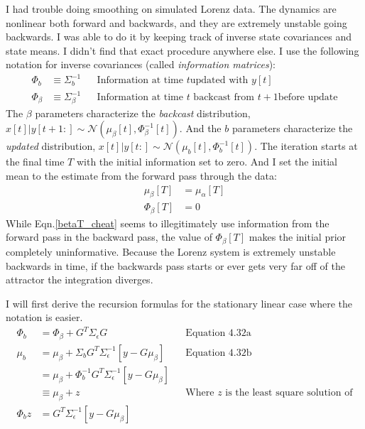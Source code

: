 \documentclass[prelim,showlabels]{book}
\newcommand{\Normal}{{\mathcal{N}}}
\begin{document}
I had trouble doing smoothing on simulated Lorenz data.  The dynamics
are nonlinear both forward and backwards, and they are extremely
unstable going backwards.  I was able to do it by keeping track of
inverse state covariances and state means.  I didn't find that exact
procedure anywhere else.  I use the following notation for inverse
covariances (called \emph{information matrices}):
\begin{align}
  \Phi_b &\equiv \Sigma_b^{-1} && \text{Information at time $t$
                                  updated with $y[t]$}\\
  \Phi_\beta &\equiv \Sigma_\beta^{-1} && \text{Information at time
                                          $t$ backcast from $t+1$
                                          before update}                             
\end{align}
The $\beta$ parameters characterize the \emph{backcast} distribution,
$x[t]|y[t+1:] \sim \Normal\left(\mu_\beta[t], \Phi_\beta^{-1}[t]\right)$. 
And the $b$ parameters characterize the \emph{updated} distribution,
$x[t]|y[t:] \sim \Normal\left(\mu_b[t], \Phi_b^{-1}[t]\right)$. 
The iteration starts at the final time $T$ with the initial information
set to zero.  And I set the initial mean to the estimate
from the forward pass through the data:
\begin{align}
  \label{betaT_cheat}
  \mu_\beta[T] &= \mu_\alpha[T] \\
  \Phi_\beta[T] &= 0
\end{align}
While Eqn.\eqref{betaT_cheat} seems to illegitimately use information
from the forward pass in the backward pass, the value of
$\Phi_\beta[T]$ makes the initial prior completely uninformative.
Because the Lorenz system is extremely unstable backwards in time, if
the backwards pass starts or ever gets very far off of the attractor
the integration diverges.

I will first derive the recursion formulas for the stationary linear
case where the notation is easier.
\begin{align}
  \Phi_b &= \Phi_\beta + G^T \Sigma_\epsilon G && \text{Equation
                                                  4.32a} \\
  \mu_b &= \mu_\beta + \Sigma_b G^T \Sigma_\epsilon^{-1} \left[y -
          G\mu_\beta \right] && \text{Equation 4.32b}\\
  \label{eq:linear_mu_b}
  &= \mu_\beta + \Phi_b^{-1} G^T \Sigma_\epsilon^{-1} \left[ y - G
    \mu_\beta \right] \\
  &\equiv \mu_\beta + z && \text{Where $z$ is the least square
                           solution of} \\
  \Phi_bz &= G^T \Sigma_\epsilon^{-1} \left[ y - G \mu_\beta \right]
\end{align}
\end{document}
